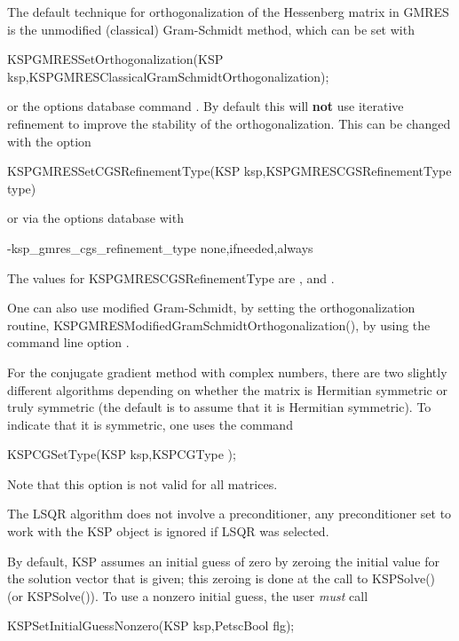 The default technique for orthogonalization of the Hessenberg
matrix in GMRES is
the
unmodified (classical) Gram-Schmidt method, which can be set 
with
\begin{tabbing}
  KSPGMRESSetOrthogonalization(KSP ksp,KSPGMRESClassicalGramSchmidtOrthogonalization);
\end{tabbing}
or the options database 
command .
By default this will {\bf not} use iterative refinement to improve the
stability of the orthogonalization.
This can be changed with the option
\begin{tabbing}
KSPGMRESSetCGSRefinementType(KSP ksp,KSPGMRESCGSRefinementType type)
\end{tabbing}
or via the options database with
\begin{tabbing}
-ksp\_gmres\_cgs\_refinement\_type none,ifneeded,always
\end{tabbing}
The values for KSPGMRESCGSRefinementType are , 
 and .
 

One can also use
modified Gram-Schmidt,
by setting the orthogonalization routine,
KSPGMRESModifiedGramSchmidtOrthogonalization(), by using the command line option
. 

For the conjugate gradient method with complex numbers, there are two
slightly different algorithms depending on whether the matrix is
Hermitian symmetric or truly symmetric (the default is to assume that
it is Hermitian symmetric). To indicate that it is symmetric, one uses the command
\begin{tabbing}
  KSPCGSetType(KSP ksp,KSPCGType );
\end{tabbing}
Note that this option is not valid for all matrices.

The LSQR algorithm does not involve a preconditioner, any preconditioner
set to work with the KSP object is ignored if LSQR was selected.

By default, KSP assumes an initial guess of zero by zeroing the initial
value for the solution vector that is given; this zeroing is done at the
call to KSPSolve() (or KSPSolve()). To use a nonzero
initial guess, the user {\em must} call
\begin{tabbing}
  KSPSetInitialGuessNonzero(KSP ksp,PetscBool  flg);
\end{tabbing}

